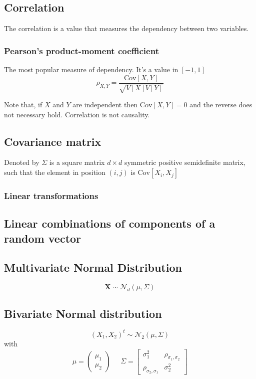 \subsection{Correlation}
The correlation is a value that measures the dependency between two variables.
\subsubsection{Pearson's product-moment coefficient}
The most popular measure of dependency. It's a value in $[-1,1]$ 
\[ \rho_{X,Y} = \frac{\text{Cov}[X,Y]}{\sqrt{V[X]V[Y]}} \]
\begin{tcolorbox}
    Note that, if $X$ and $Y$ are independent then $\text{Cov}[X,Y]=0$ and the
    reverse does not necessary hold. Correlation is not causality.    
\end{tcolorbox}

\subsection{Covariance matrix}
Denoted by $\Sigma$ is a square matrix $d \times d$ symmetric positive
semidefinite matrix, such that the element in position $(i,j)$ is
$\text{Cov}[X_i,X_j]$

\subsubsection{Linear transformations}

\subsection{Linear combinations of components of a random vector}

\subsection{Multivariate Normal Distribution}
\[ \textbf{X} \sim \mathcal{N}_d(\mu,\Sigma)\]

\subsection{Bivariate Normal distribution}
\[ (X_1,X_2)^t \sim \mathcal{N}_2(\mu,\Sigma) \] with
\[ \mu=\begin{pmatrix}\mu_1\\\mu_2\end{pmatrix}\;\;\;\;\; \Sigma=\begin{bmatrix}
    \sigma_1^2 & \rho_{\sigma_1,\sigma_2}\\
        \rho_{\sigma_2,\sigma_1} & \sigma^2_2
    \end{bmatrix}
\]


